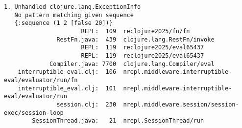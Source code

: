 \begin{verbatim}
1. Unhandled clojure.lang.ExceptionInfo
   No pattern matching given sequence
   {:sequence (1 2 [false 20])}
                      REPL:  109  reclojure2025/fn/fn
               RestFn.java:  439  clojure.lang.RestFn/invoke
                      REPL:  119  reclojure2025/eval65437
                      REPL:  119  reclojure2025/eval65437
             Compiler.java: 7700  clojure.lang.Compiler/eval
    interruptible_eval.clj:  106  nrepl.middleware.interruptible-eval/evaluator/run/fn
    interruptible_eval.clj:  101  nrepl.middleware.interruptible-eval/evaluator/run
               session.clj:  230  nrepl.middleware.session/session-exec/session-loop
        SessionThread.java:   21  nrepl.SessionThread/run
\end{verbatim}

